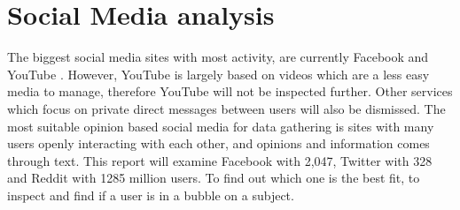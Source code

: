 \section{Social Media analysis}\label{sec:SocialMediaAnalysis}
The biggest social media sites with most activity, are currently Facebook and
YouTube \citep{SocialMediaStats}.
However, YouTube is largely based on videos which are a less easy media to
manage, therefore YouTube will not be inspected further. Other services which
focus on private direct messages between users will also be dismissed. The most
suitable opinion based social media for data gathering is sites with many users
openly interacting with each other, and opinions and information comes through
text. This report will examine Facebook with 2,047, Twitter with 328 and
Reddit with 1285 million users. To find out which one is the best fit, to inspect and
find if a user is in a bubble on a subject.